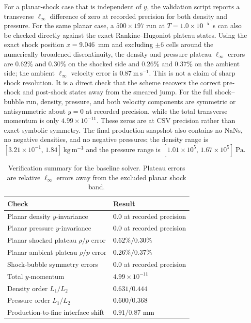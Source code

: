 \documentclass[final,3p,times,twocolumn]{elsarticle}
\begin{document}
For a planar-shock case that is independent of $y$, the validation script reports a transverse $\ell_\infty$ difference of zero at recorded precision for both density and pressure. For the same planar case, a $500 \times 197$ run at $T = 1.0 \times 10^{-5}$~s can also be checked directly against the exact Rankine--Hugoniot plateau states. Using the exact shock position $x = 9.046$~mm and excluding $\pm 6$ cells around the numerically broadened discontinuity, the density and pressure plateau $\ell_\infty$ errors are $0.62\%$ and $0.30\%$ on the shocked side and $0.26\%$ and $0.37\%$ on the ambient side; the ambient $\ell_\infty$ velocity error is $0.87~\mathrm{m\,s^{-1}}$. This is not a claim of sharp shock resolution. It is a direct check that the scheme recovers the correct pre-shock and post-shock states away from the smeared jump. For the full shock--bubble run, density, pressure, and both velocity components are symmetric or antisymmetric about $y=0$ at recorded precision, while the total transverse momentum is only $4.99 \times 10^{-11}$. These zeros are at CSV precision rather than exact symbolic symmetry. The final production snapshot also contains no NaNs, no negative densities, and no negative pressures; the density range is $[3.21 \times 10^{-1},\,1.84]~\mathrm{kg\,m^{-3}}$ and the pressure range is $[1.01 \times 10^{5},\,1.67 \times 10^{5}]~\mathrm{Pa}$.

\begin{table}[t]
\centering
\caption{Verification summary for the baseline solver. Plateau errors are relative $\ell_\infty$ errors away from the excluded planar shock band.}
\label{tab:validation}
\begin{tabular}{ll}
\toprule
Check & Result \\
\midrule
Planar density $y$-invariance & $0.0$ at recorded precision \\
Planar pressure $y$-invariance & $0.0$ at recorded precision \\
Planar shocked plateau $\rho/p$ error & $0.62\% / 0.30\%$ \\
Planar ambient plateau $\rho/p$ error & $0.26\% / 0.37\%$ \\
Shock-bubble symmetry errors & $0.0$ at recorded precision \\
Total $y$-momentum & $4.99 \times 10^{-11}$ \\
Density order $L_1/L_2$ & $0.631 / 0.444$ \\
Pressure order $L_1/L_2$ & $0.600 / 0.368$ \\
Production-to-fine interface shift & $0.91 / 0.87$ mm \\
\bottomrule
\end{tabular}
\end{table}
\end{document}
